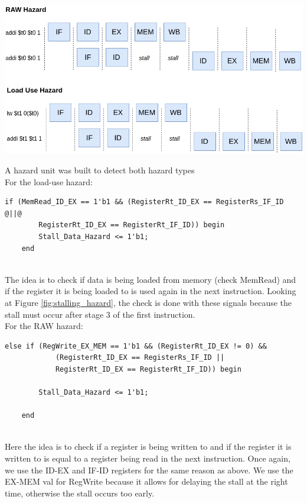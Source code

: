 \documentclass[twocolumn]{article}
\begin{document}
\newpage 

\begingroup
    \centering
    \medskip
    \includegraphics[width=\columnwidth]{Lab-Tex/Lab7-images/stalling_hazard.png}
    \label{fig:stalling_hazard}
    \medskip
\endgroup

A hazard unit was built to detect both hazard types\\

For the load-use hazard:

\begin{lstlisting}[escapechar=@]
    if (MemRead_ID_EX == 1'b1 && (RegisterRt_ID_EX == RegisterRs_IF_ID @||@
        RegisterRt_ID_EX == RegisterRt_IF_ID)) begin
        Stall_Data_Hazard <= 1'b1;
    end
\end{lstlisting}
\\

The idea is to check if data is being loaded from memory (check MemRead) and if the register it is being loaded to is used again in the next instruction. Looking at Figure \ref{fig:stalling_hazard}, the check is done with these signals because the stall must occur after stage 3 of the first instruction.\\

For the RAW hazard:

\begin{lstlisting}[escapechar=@]
    else if (RegWrite_EX_MEM == 1'b1 && (RegisterRt_ID_EX != 0) &&
            (RegisterRt_ID_EX == RegisterRs_IF_ID ||
            RegisterRt_ID_EX == RegisterRt_IF_ID)) begin

        Stall_Data_Hazard <= 1'b1;

    end
\end{lstlisting}
\\

Here the idea is to check if a register is being written to and if the register it is written to is equal to a register being read in the next instruction. Once again, we use the ID-EX and IF-ID registers for the same reason as above. We use the EX-MEM val for RegWrite because it allows for delaying the stall at the right time, otherwise the stall occurs too early. \\
\end{document}
